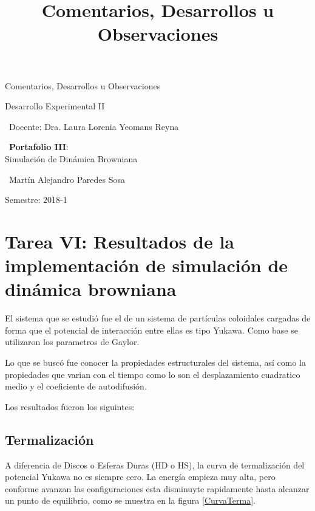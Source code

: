 \documentclass[12pt,letterpaper]{article}
\title{ Comentarios, Desarrollos u Observaciones  }
\begin{document}
\begin{titlepage}
	\centering
    \vspace*{2cm}
	{\Huge Comentarios, Desarrollos u Observaciones \par}
	\vfill
	{\Large Desarrollo Experimental II \par}
	\vfill
	{\large\ Docente: Dra. Laura Lorenia Yeomans Reyna \par}
    \vfill
    {\large\ \textbf{Portafolio III}:\\ Simulación de Dinámica Browniana \par}
    \vfill
    {\large\ Martín Alejandro Paredes Sosa \par}
	\vfill
	{\large Semestre: 2018-1\par}
\end{titlepage}

\section*{Tarea VI: Resultados de la implementación de simulación de dinámica browniana}

El sistema que se estudió fue el de un sistema de partículas coloidales cargadas de forma que el potencial de interacción entre ellas es tipo Yukawa. Como base se utilizaron los parametros de Gaylor. 

Lo que se buscó fue conocer la propiedades estructurales del sistema, así como la propiedades que varian con el tiempo como lo son el desplazamiento cuadratico medio y el coeficiente de autodifusión.

Los resultados fueron los siguintes:

\subsection*{Termalización} %
A diferencia de Discos o Esferas Duras (HD o HS), la curva de termalización del potencial Yukawa no es siempre cero. La energía empieza muy alta, pero  conforme avanzan las configuraciones esta disminuyte rapidamente hasta alcanzar un punto de equilibrio, como se muestra en la figura \ref{CurvaTerma}.
\end{document}
